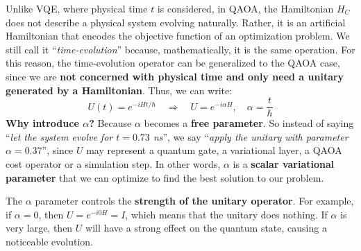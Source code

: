 \highspace
Unlike VQE, where physical time $t$ is considered, in QAOA, the Hamiltonian $H_C$ does not describe a physical system evolving naturally. Rather, it is an artificial Hamiltonian that encodes the objective function of an optimization problem. We still call it ``\emph{time-evolution}'' because, mathematically, it is the same operation. For this reason, the time-evolution operator can be generalized to the QAOA case, since we are \textbf{not concerned with physical time and only need a unitary generated by a Hamiltonian}. Thus, we can write:
\begin{equation*}
    U(t) = e^{-i H t / \hbar} \quad \Rightarrow \quad U = e^{-i \alpha H}, \quad \alpha = \dfrac{t}{\hbar}
\end{equation*}
\textcolor{Green3}{ \textbf{Why introduce $\alpha$?}} Because $\alpha$ becomes a \textbf{free parameter}. So instead of saying ``\emph{let the system evolve for $t = 0.73$ ns}'', we say ``\emph{apply the unitary with parameter $\alpha = 0.37$}'', since $U$ may represent a quantum gate, a variational layer, a QAOA cost operator or a simulation step. In other words, $\alpha$ is a \textbf{scalar variational parameter} that we can optimize to find the best solution to our problem.

\highspace
The $\alpha$ parameter controls the \textbf{strength of the unitary operator}. For example, if $\alpha = 0$, then $U = e^{-i 0 H} = I$, which means that the unitary does nothing. If $\alpha$ is very large, then $U$ will have a strong effect on the quantum state, causing a noticeable evolution.

